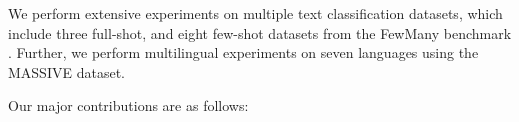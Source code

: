 We perform extensive experiments on multiple text classification datasets, which include three full-shot, and eight few-shot datasets from the {\sc FewMany} benchmark \cite{yehudai2024llms}. Further, we perform multilingual experiments on seven languages using the {\sc MASSIVE} \cite{fitzgerald2022massive1mexamplemultilingualnatural} dataset. 



Our major contributions are as follows:




